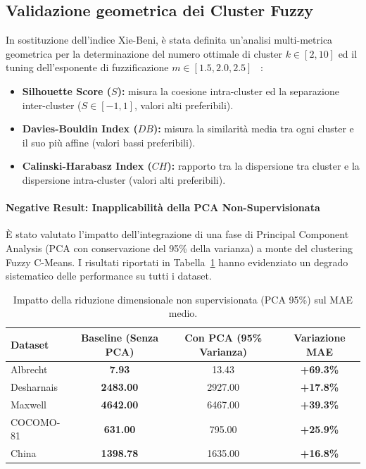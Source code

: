 \documentclass[11pt, a4paper]{article}
\begin{document}
\subsection{Validazione geometrica dei Cluster Fuzzy}
In sostituzione dell'indice Xie-Beni, è stata definita un'analisi multi-metrica
geometrica per la determinazione del numero ottimale di cluster $k \in [2, 10]$
ed il tuning dell'esponente di fuzzificazione $m \in [1.5, 2.0, 2.5]$
~\cite{rouseeuw1987silhouettes}:
\begin{itemize}
    \item \textbf{Silhouette Score ($S$):} misura la coesione intra-cluster ed la separazione inter-cluster ($S \in [-1, 1]$, valori alti preferibili).
    \item \textbf{Davies-Bouldin Index ($DB$):} misura la similarità media tra ogni cluster e il suo più affine (valori bassi preferibili).
    \item \textbf{Calinski-Harabasz Index ($CH$):} rapporto tra la dispersione tra cluster e la dispersione intra-cluster (valori alti preferibili).
\end{itemize}

\paragraph{Negative Result: Inapplicabilità della PCA Non-Supervisionata}
È stato valutato l'impatto dell'integrazione di una fase di Principal Component Analysis (PCA con conservazione del 95\% della varianza) a monte del clustering Fuzzy C-Means. I risultati riportati in Tabella~\ref{tab:pca_failure} hanno evidenziato un degrado sistematico delle performance su tutti i dataset.

\begin{table}[htbp]
    \centering
    \caption{Impatto della riduzione dimensionale non supervisionata (PCA 95\%) sul MAE medio.}\label{tab:pca_failure}
    \small
    \begin{tabular}{lccc}
        \toprule
        \rowcolor{tableheader} \textbf{Dataset} & \textbf{Baseline (Senza PCA)} & \textbf{Con PCA (95\% Varianza)} & \textbf{Variazione MAE} \\
        \midrule
        Albrecht                                & \textbf{7.93}                 & 13.43                            & \textbf{+69.3\%}        \\
        Desharnais                              & \textbf{2483.00}              & 2927.00                          & \textbf{+17.8\%}        \\
        Maxwell                                 & \textbf{4642.00}              & 6467.00                          & \textbf{+39.3\%}        \\
        COCOMO-81                               & \textbf{631.00}               & 795.00                           & \textbf{+25.9\%}        \\
        China                                   & \textbf{1398.78}              & 1635.00                          & \textbf{+16.8\%}        \\
        \bottomrule
    \end{tabular}
\end{table}
\end{document}

